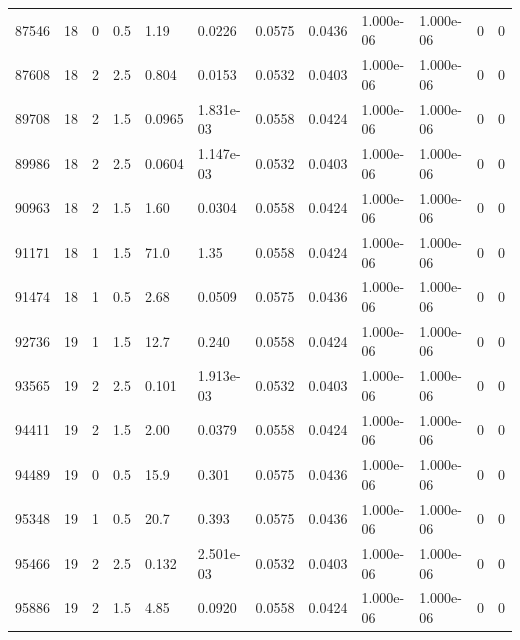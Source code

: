 \documentclass[preview]{standalone}
\begin{document}
{{{\begin{tabular}{L{1.2cm}C{1.2cm} C{0.3cm}C{0.5cm} C{1.4cm}C{1.4cm} C{1.4cm}C{1.4cm} C{1.6cm}C{1.6cm} C{1.6cm}C{1.6cm}}
  87546  &    18  & 0     & 0.5 &  1.19  & 0.0226  &  0.0575&   0.0436& 1.000e-06 & 1.000e-06   &  0 & 0  \\ 
  87608  &    18  & 2     & 2.5 &  0.804  & 0.0153  &  0.0532&   0.0403& 1.000e-06 & 1.000e-06   &  0 & 0  \\ 
  89708  &    18  & 2     & 1.5 &  0.0965  & 1.831e-03  &  0.0558&   0.0424& 1.000e-06 & 1.000e-06   &  0 & 0  \\ 
  89986  &    18  & 2     & 2.5 &  0.0604  & 1.147e-03  &  0.0532&   0.0403& 1.000e-06 & 1.000e-06   &  0 & 0  \\ 
  90963  &    18  & 2     & 1.5 &  1.60  & 0.0304  &  0.0558&   0.0424& 1.000e-06 & 1.000e-06   &  0 & 0  \\ 
  91171  &    18  & 1     & 1.5 &  71.0  & 1.35  &  0.0558&   0.0424& 1.000e-06 & 1.000e-06   &  0 & 0  \\ 
  91474  &    18  & 1     & 0.5 &  2.68  & 0.0509  &  0.0575&   0.0436& 1.000e-06 & 1.000e-06   &  0 & 0  \\ 
  92736  &    19  & 1     & 1.5 &  12.7  & 0.240  &  0.0558&   0.0424& 1.000e-06 & 1.000e-06   &  0 & 0  \\ 
  93565  &    19  & 2     & 2.5 &  0.101  & 1.913e-03  &  0.0532&   0.0403& 1.000e-06 & 1.000e-06   &  0 & 0  \\ 
  94411  &    19  & 2     & 1.5 &  2.00  & 0.0379  &  0.0558&   0.0424& 1.000e-06 & 1.000e-06   &  0 & 0  \\ 
  94489  &    19  & 0     & 0.5 &  15.9  & 0.301  &  0.0575&   0.0436& 1.000e-06 & 1.000e-06   &  0 & 0  \\ 
  95348  &    19  & 1     & 0.5 &  20.7  & 0.393  &  0.0575&   0.0436& 1.000e-06 & 1.000e-06   &  0 & 0  \\ 
  95466  &    19  & 2     & 2.5 &  0.132  & 2.501e-03  &  0.0532&   0.0403& 1.000e-06 & 1.000e-06   &  0 & 0  \\ 
  95886  &    19  & 2     & 1.5 &  4.85  & 0.0920  &  0.0558&   0.0424& 1.000e-06 & 1.000e-06   &  0 & 0  \\ 
\hline 
\end{tabular} 

}}}
\end{document}
